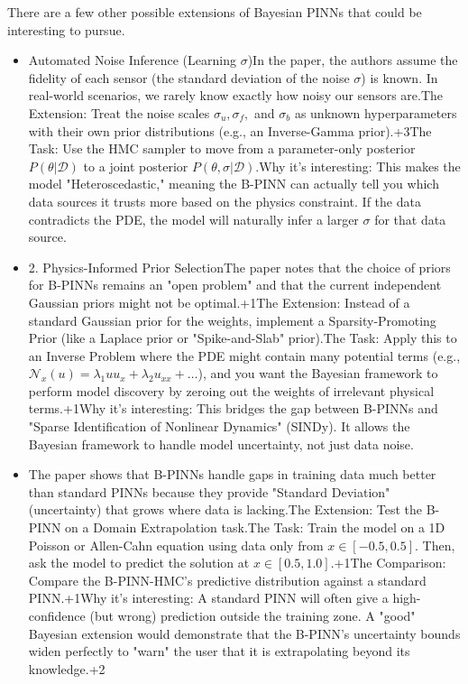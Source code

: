 \documentclass[11pt, a4paper]{article}
\begin{document}
There are a few other possible extensions of Bayesian PINNs that could be interesting to pursue. 

\begin{itemize}
\item Automated Noise Inference (Learning $\sigma$)In the paper, the authors assume the fidelity of each sensor (the standard deviation of the noise $\sigma$) is known. In real-world scenarios, we rarely know exactly how noisy our sensors are.The Extension: Treat the noise scales $\sigma_u, \sigma_f,$ and $\sigma_b$ as unknown hyperparameters with their own prior distributions (e.g., an Inverse-Gamma prior).+3The Task: Use the HMC sampler to move from a parameter-only posterior $P(\theta|\mathcal{D})$ to a joint posterior $P(\theta, \sigma|\mathcal{D})$.Why it's interesting: This makes the model "Heteroscedastic," meaning the B-PINN can actually tell you which data sources it trusts more based on the physics constraint. If the data contradicts the PDE, the model will naturally infer a larger $\sigma$ for that data source.
\item 2. Physics-Informed Prior SelectionThe paper notes that the choice of priors for B-PINNs remains an "open problem" and that the current independent Gaussian priors might not be optimal.+1The Extension: Instead of a standard Gaussian prior for the weights, implement a Sparsity-Promoting Prior (like a Laplace prior or "Spike-and-Slab" prior).The Task: Apply this to an Inverse Problem where the PDE might contain many potential terms (e.g., $\mathcal{N}_x(u) = \lambda_1 u u_x + \lambda_2 u_{xx} + \dots$), and you want the Bayesian framework to perform model discovery by zeroing out the weights of irrelevant physical terms.+1Why it's interesting: This bridges the gap between B-PINNs and "Sparse Identification of Nonlinear Dynamics" (SINDy). It allows the Bayesian framework to handle model uncertainty, not just data noise.
\item The paper shows that B-PINNs handle gaps in training data much better than standard PINNs because they provide "Standard Deviation" (uncertainty) that grows where data is lacking.The Extension: Test the B-PINN on a Domain Extrapolation task.The Task: Train the model on a 1D Poisson or Allen-Cahn equation using data only from $x \in [-0.5, 0.5]$. Then, ask the model to predict the solution at $x \in [0.5, 1.0]$.+1The Comparison: Compare the B-PINN-HMC's predictive distribution against a standard PINN.+1Why it's interesting: A standard PINN will often give a high-confidence (but wrong) prediction outside the training zone. A "good" Bayesian extension would demonstrate that the B-PINN’s uncertainty bounds widen perfectly to "warn" the user that it is extrapolating beyond its knowledge.+2

\end{itemize}
\end{document}
